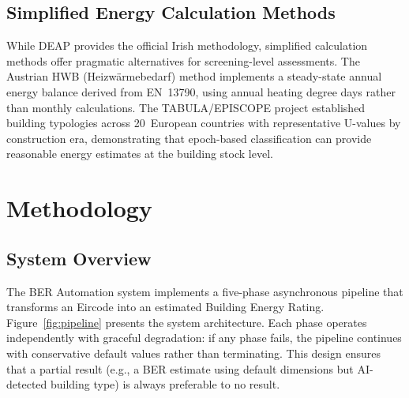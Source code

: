 \documentclass[preprint,12pt,authoryear]{elsarticle}
\begin{document}
\subsection{Simplified Energy Calculation Methods}

While DEAP provides the official Irish methodology, simplified calculation methods offer pragmatic alternatives for screening-level assessments. The Austrian HWB (Heizw\"armebedarf) method \citep{hwb_leitfaden_2019} implements a steady-state annual energy balance derived from EN~13790, using annual heating degree days rather than monthly calculations. The TABULA/EPISCOPE project \citep{tabula_episcope} established building typologies across 20~European countries with representative U-values by construction era, demonstrating that epoch-based classification can provide reasonable energy estimates at the building stock level.

\section{Methodology}
\label{sec:methodology}

\subsection{System Overview}

The BER Automation system implements a five-phase asynchronous pipeline that transforms an Eircode into an estimated Building Energy Rating. Figure~\ref{fig:pipeline} presents the system architecture. Each phase operates independently with graceful degradation: if any phase fails, the pipeline continues with conservative default values rather than terminating. This design ensures that a partial result (e.g., a BER estimate using default dimensions but AI-detected building type) is always preferable to no result.
\end{document}
